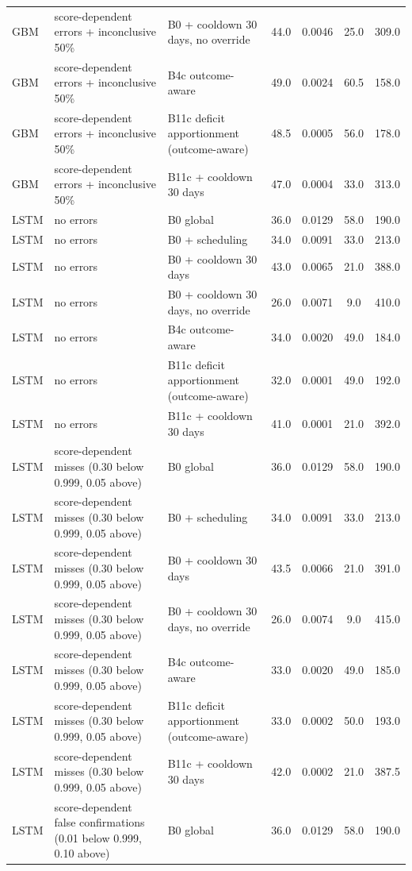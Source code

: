 \begin{longtable}{lp{5.2cm}p{4.4cm}cccc}
GBM & score-dependent errors + inconclusive 50\% & B0 + cooldown 30 days, no override & 44.0 & 0.0046 & 25.0 & 309.0 \\
GBM & score-dependent errors + inconclusive 50\% & B4c outcome-aware & 49.0 & 0.0024 & 60.5 & 158.0 \\
GBM & score-dependent errors + inconclusive 50\% & B11c deficit apportionment (outcome-aware) & 48.5 & 0.0005 & 56.0 & 178.0 \\
GBM & score-dependent errors + inconclusive 50\% & B11c + cooldown 30 days & 47.0 & 0.0004 & 33.0 & 313.0 \\
LSTM & no errors & B0 global & 36.0 & 0.0129 & 58.0 & 190.0 \\
LSTM & no errors & B0 + scheduling & 34.0 & 0.0091 & 33.0 & 213.0 \\
LSTM & no errors & B0 + cooldown 30 days & 43.0 & 0.0065 & 21.0 & 388.0 \\
LSTM & no errors & B0 + cooldown 30 days, no override & 26.0 & 0.0071 & 9.0 & 410.0 \\
LSTM & no errors & B4c outcome-aware & 34.0 & 0.0020 & 49.0 & 184.0 \\
LSTM & no errors & B11c deficit apportionment (outcome-aware) & 32.0 & 0.0001 & 49.0 & 192.0 \\
LSTM & no errors & B11c + cooldown 30 days & 41.0 & 0.0001 & 21.0 & 392.0 \\
LSTM & score-dependent misses (0.30 below 0.999, 0.05 above) & B0 global & 36.0 & 0.0129 & 58.0 & 190.0 \\
LSTM & score-dependent misses (0.30 below 0.999, 0.05 above) & B0 + scheduling & 34.0 & 0.0091 & 33.0 & 213.0 \\
LSTM & score-dependent misses (0.30 below 0.999, 0.05 above) & B0 + cooldown 30 days & 43.5 & 0.0066 & 21.0 & 391.0 \\
LSTM & score-dependent misses (0.30 below 0.999, 0.05 above) & B0 + cooldown 30 days, no override & 26.0 & 0.0074 & 9.0 & 415.0 \\
LSTM & score-dependent misses (0.30 below 0.999, 0.05 above) & B4c outcome-aware & 33.0 & 0.0020 & 49.0 & 185.0 \\
LSTM & score-dependent misses (0.30 below 0.999, 0.05 above) & B11c deficit apportionment (outcome-aware) & 33.0 & 0.0002 & 50.0 & 193.0 \\
LSTM & score-dependent misses (0.30 below 0.999, 0.05 above) & B11c + cooldown 30 days & 42.0 & 0.0002 & 21.0 & 387.5 \\
LSTM & score-dependent false confirmations (0.01 below 0.999, 0.10 above) & B0 global & 36.0 & 0.0129 & 58.0 & 190.0 \\

\end{longtable}
